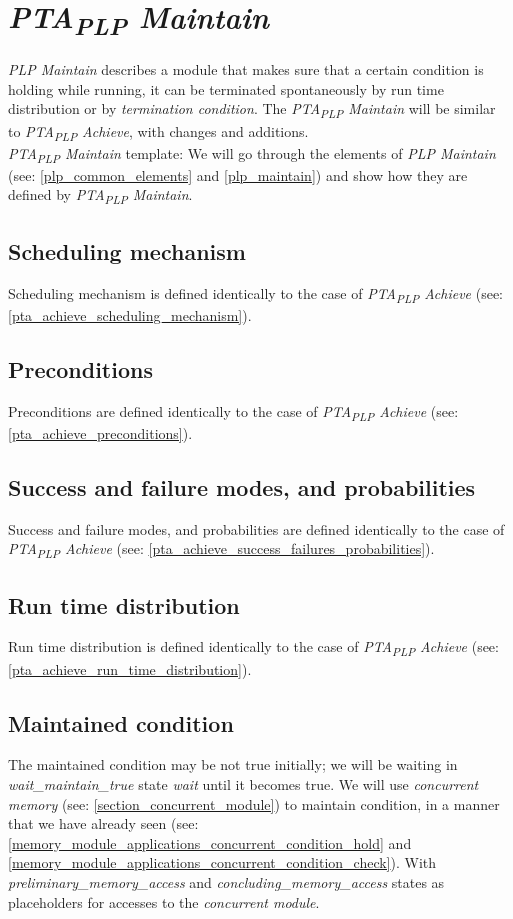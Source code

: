 \section{\textit{PTA\textsubscript{PLP} Maintain}}
\textit{PLP Maintain} describes a module that makes sure that a certain condition is holding while running, it can be terminated spontaneously by run time distribution or by \textit{termination condition}. The \textit{PTA\textsubscript{PLP} Maintain} will be similar to \textit{PTA\textsubscript{PLP} Achieve}, with changes and additions. \\
\textit{PTA\textsubscript{PLP} Maintain} template:   We will go through the elements of \textit{PLP Maintain} (see: \ref{plp_common_elements} and \ref{plp_maintain}) and show how they are defined by \textit{PTA\textsubscript{PLP} Maintain}.\\
\subsection{Scheduling mechanism}
Scheduling mechanism is defined identically to the case of \textit{PTA\textsubscript{PLP} Achieve} (see: \ref{pta_achieve_scheduling_mechanism}).\\
\subsection{Preconditions}
Preconditions are defined identically to the case of \textit{PTA\textsubscript{PLP} Achieve} (see: \ref{pta_achieve_preconditions}).\\
\subsection{Success and failure modes, and probabilities }
Success and failure modes, and probabilities are defined identically to the case of \textit{PTA\textsubscript{PLP} Achieve} (see: \ref{pta_achieve_success_failures_probabilities}).\\
\subsection{Run time distribution}
Run time distribution is defined identically to the case of \textit{PTA\textsubscript{PLP} Achieve} (see: \ref{pta_achieve_run_time_distribution}).\\
\subsection{Maintained condition }
The maintained condition may be not true initially; we will be waiting in \textcolor{ColorUppaalState}{\textit{wait_maintain_true}} state \textit{wait} until it becomes true. We will use \textit{concurrent memory} (see: \ref{section_concurrent_module}) to maintain condition, in a manner that we have already seen (see: \ref{memory_module_applications_concurrent_condition_hold} and \ref{memory_module_applications_concurrent_condition_check}). With \textcolor{ColorUppaalState}{\textit{preliminary_memory_access}} and \textcolor{ColorUppaalState}{\textit{concluding_memory_access}} states as placeholders for accesses to the \textit{concurrent module}.\\
